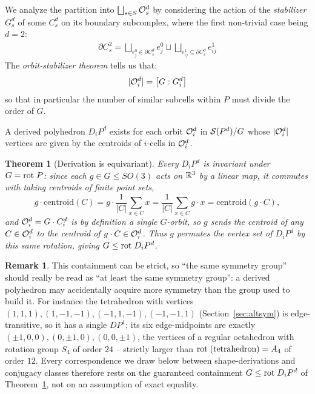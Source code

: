 \documentclass{amsart}
\theoremstyle{plain}
\newtheorem{theorem}{Theorem}
\theoremstyle{definition}
\newtheorem*{remark}{Remark}
\begin{document}
 We analyze the partition into $\bigsqcup_{s\in S}\mathcal{O}^d_s$ by considering the action of the \emph{stabilizer} $G^d_s$ of some $C^d_s$ on its boundary subcomplex, where the first non-trivial case being $d=2$: 
\begin{align}
    \partial C^2_s=\bigsqcup_{e^0_j\in \partial C^d_s}e^0_j\sqcup\bigsqcup_{e^1_{ij}\subseteq\partial C^d_s}e^1_{ij}
\end{align}
The \emph{orbit-stabilizer theorem} \cite{dummitfoote} tells us that:
\begin{equation}
    |\mathcal{O}^d_i|=\left[G:G^d_i\right]
\end{equation}
so that in particular the number of similar subcells within $P$ must divide the order of $G$.
 
A derived polyhedron $D_i P^d$ exists for each orbit $\mathcal{O}^d_i$ in $\mathcal{S}(P^d)/G$ whose $|\mathcal{O}^d_i|$ vertices are given by the centroids of $i$-cells in $\mathcal{O}^d_i$.

\begin{theorem}[Derivation is equivariant]\label{thm:derivation-equivariant}
    Every $D_iP^d$ is invariant under $G=\mathrm{rot}\hspace{1mm}P$: since each $g\in G\leq SO(3)$ acts on $\mathbb{R}^3$ by a linear map, it commutes with taking centroids of finite point sets,
    \begin{equation}
        g\cdot\mathrm{centroid}(C) = g\cdot\frac1{|C|}\sum_{x\in C}x = \frac1{|C|}\sum_{x\in C}g\cdot x = \mathrm{centroid}(g\cdot C),
    \end{equation}
    and $\mathcal{O}^d_i=G\cdot C^d_i$ is by definition a single $G$-orbit, so $g$ sends the centroid of any $C\in\mathcal{O}^d_i$ to the centroid of $g\cdot C\in\mathcal{O}^d_i$. Thus $g$ permutes the vertex set of $D_iP^d$ by this same rotation, giving $G\leq\mathrm{rot}\hspace{1mm}D_iP^d$.
\end{theorem}
\begin{remark}
    This containment can be strict, so ``the same symmetry group'' should really be read as ``at least the same symmetry group'': a derived polyhedron may accidentally acquire more symmetry than the group used to build it. For instance the tetrahedron with vertices $(1,1,1),(1,-1,-1),(-1,1,-1),(-1,-1,1)$ (Section~\ref{sec:altsym}) is edge-transitive, so it has a single $DP^1$; its six edge-midpoints are exactly $(\pm1,0,0),(0,\pm1,0),(0,0,\pm1)$, the vertices of a regular octahedron with rotation group $S_4$ of order $24$ -- strictly larger than $\mathrm{rot}\hspace{1mm}(\text{tetrahedron})=A_4$ of order $12$. Every correspondence we draw below between shape-derivations and conjugacy classes therefore rests on the guaranteed containment $G\leq\mathrm{rot}\hspace{1mm}D_iP^d$ of Theorem~\ref{thm:derivation-equivariant}, not on an assumption of exact equality.
\end{remark}
\end{document}

